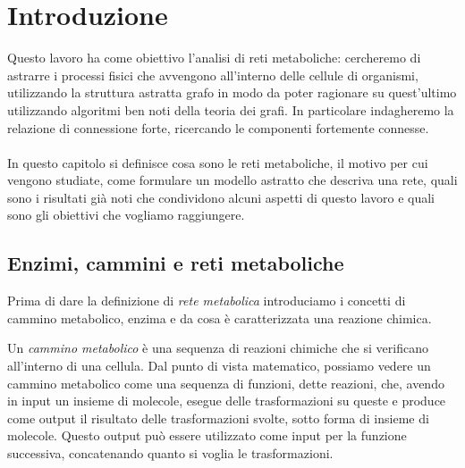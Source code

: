 \chapter{Introduzione}
\label{chapter:introduction}

Questo lavoro ha come obiettivo l'analisi di reti metaboliche:
cercheremo di astrarre i processi fisici che avvengono all'interno
delle cellule di organismi, utilizzando la struttura astratta grafo in
modo da poter ragionare su quest'ultimo utilizzando algoritmi ben noti
della teoria dei grafi. In particolare indagheremo la relazione di
connessione forte, ricercando le componenti fortemente connesse.
\\\\
In questo capitolo si definisce cosa sono le reti metaboliche, il
motivo per cui vengono studiate, come formulare un modello astratto
che descriva una rete, quali sono i risultati gi\`a noti che
condividono alcuni aspetti di questo lavoro e quali sono gli obiettivi
che vogliamo raggiungere.




\section{Enzimi, cammini e reti metaboliche}

Prima di dare la definizione di \emph{rete metabolica} introduciamo i
concetti di cammino metabolico, enzima e da cosa \`e caratterizzata
una reazione chimica.

Un \emph{cammino metabolico} \`e una sequenza di reazioni chimiche che
si verificano all'interno di una cellula. Dal punto di vista
matematico, possiamo vedere un cammino metabolico come una sequenza di
funzioni, dette reazioni, che, avendo in input un insieme di molecole,
esegue delle trasformazioni su queste e produce come output il
risultato delle trasformazioni svolte, sotto forma di insieme di
molecole. Questo output pu\`o essere utilizzato come input per la
funzione successiva, concatenando quanto si voglia le trasformazioni.

